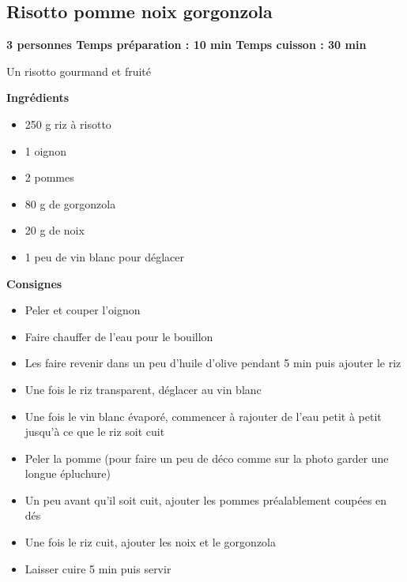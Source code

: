 \documentclass[]{book}
\providecommand{\tightlist}{%
  \setlength{\itemsep}{0pt}\setlength{\parskip}{0pt}}
\begin{document}
\subsection*{\texorpdfstring{{Risotto pomme noix
gorgonzola}}{Risotto pomme noix gorgonzola}}\label{risotto-pomme-noix-gorgonzola}

\begin{salebox}
\textbf{3 personnes \textbar{} Temps préparation : 10 min \textbar{}
Temps cuisson : 30 min}

Un risotto gourmand et fruité
\end{salebox}

 \textbf{Ingrédients}

\begin{itemize}
\tightlist
\item
  250 g riz à risotto
\item
  1 oignon
\item
  2 pommes
\item
  80 g de gorgonzola
\item
  20 g de noix
\item
  1 peu de vin blanc pour déglacer
\end{itemize}

\textbf{Consignes}

\begin{itemize}
\tightlist
\item
  Peler et couper l'oignon
\item
  Faire chauffer de l'eau pour le bouillon
\item
  Les faire revenir dans un peu d'huile d'olive pendant 5 min puis
  ajouter le riz
\item
  Une fois le riz transparent, déglacer au vin blanc
\item
  Une fois le vin blanc évaporé, commencer à rajouter de l'eau petit à
  petit jusqu'à ce que le riz soit cuit
\item
  Peler la pomme (pour faire un peu de déco comme sur la photo garder
  une longue épluchure)
\item
  Un peu avant qu'il soit cuit, ajouter les pommes préalablement coupées
  en dés
\item
  Une fois le riz cuit, ajouter les noix et le gorgonzola
\item
  Laisser cuire 5 min puis servir
\end{itemize}
\end{document}
